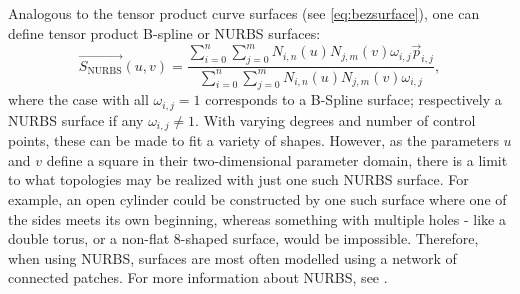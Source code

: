 Analogous to the tensor product \Bez curve surfaces (see \autoref{eq:bezsurface}), one can define tensor product B-spline or NURBS surfaces:
\begin{equation}
\label{eq:nurbssurface}
\vec{S_\text{NURBS}}(u,v)=\frac{\sum\limits_{i=0}^n \sum\limits_{j=0}^m N_{i,n}(u) N_{j,m}(v) \omega_{i,j}\vec{p}_{i,j}}{\sum\limits_{i=0}^n \sum\limits_{j=0}^m N_{i,n}(u) N_{j,m}(v) \omega_{i,j}},
\end{equation}
where the case with all $\omega_{i,j} = 1$ corresponds to a B-Spline surface; respectively a NURBS surface if any $\omega_{i,j} \neq 1 $.
With varying degrees and number of control points, these can be made to fit a variety of shapes. However, as the parameters $u$ and $v$ define a square in their two-dimensional parameter domain, there is a limit to what topologies may be realized with just one such NURBS surface. For example, an open cylinder could be constructed by one such surface where one of the sides meets its own beginning, whereas something with multiple holes - like a double torus, or a non-flat 8-shaped surface, would be impossible. Therefore, when using NURBS, surfaces are most often modelled using a network of connected patches.  For more information about NURBS, see \cite{farin1999nurbs}.
